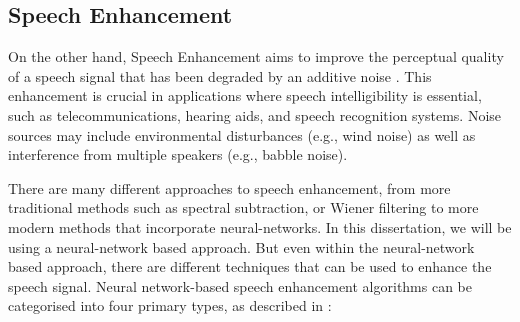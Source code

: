 \documentclass[logo,bsc,singlespacing,parskip,online]{infthesis}
\begin{document}

\subsection{Speech Enhancement}
On the other hand, Speech Enhancement aims to improve the perceptual quality of a speech signal that 
has been degraded by an additive noise \citep{loizou_speech_2007}. 
This enhancement is crucial in applications where speech intelligibility is essential, such as telecommunications, hearing aids, and speech recognition systems. Noise sources may include environmental disturbances (e.g., wind noise) as well as interference from multiple speakers (e.g., babble noise).

There are many different approaches to speech enhancement, from more traditional methods such as spectral subtraction, or Wiener filtering
to more modern methods that incorporate neural-networks. In this dissertation, we will be using a neural-network based approach.
But even within the neural-network based approach, there are different techniques that can be used to enhance the speech signal. 
Neural network-based speech enhancement algorithms can be categorised into four primary types, as described in \cite{katagiri_handbook_2000}:
\end{document}
